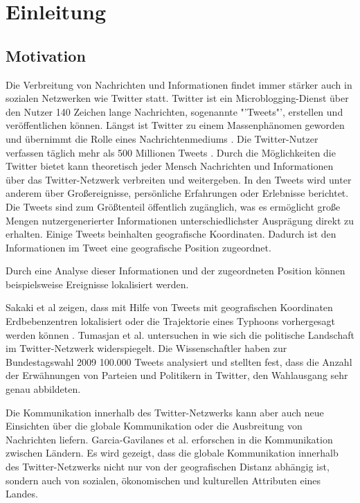\chapter{Einleitung}\label{chp:Einleitung}

	\section{Motivation}

		Die Verbreitung von Nachrichten und Informationen findet immer stärker auch in sozialen Netzwerken wie Twitter statt.
		Twitter ist ein Microblogging-Dienst über den Nutzer 140 Zeichen lange Nachrichten, sogenannte "'Tweets"', erstellen und veröffentlichen können.
		Längst ist Twitter zu einem Massenphänomen geworden und übernimmt die Rolle eines Nachrichtenmediums \cite{Petrovic2013}.
		Die Twitter-Nutzer verfassen täglich mehr als 500 Millionen Tweets \cite{twitterinc2013}. 
		Durch die Möglichkeiten die Twitter bietet kann theoretisch jeder Mensch Nachrichten und Informationen über das Twitter-Netzwerk verbreiten und weitergeben. 
		In den Tweets wird unter anderem über Großereignisse, persönliche Erfahrungen oder Erlebnisse berichtet. 
		Die Tweets sind zum Größtenteil öffentlich zugänglich, was es ermöglicht große Mengen nutzergenerierter Informationen unterschiedlichster Ausprägung direkt zu erhalten. 
		Einige Tweets beinhalten geografische Koordinaten. 
		Dadurch ist den Informationen im Tweet eine geografische Position zugeordnet.

		Durch eine Analyse dieser Informationen und der zugeordneten Position können beispielsweise Ereignisse lokalisiert werden.

		Sakaki et al zeigen, dass mit Hilfe von Tweets mit geografischen Koordinaten Erdbebenzentren lokalisiert oder die Trajektorie eines Typhoons vorhergesagt werden können \cite{Sakaki2010}.  
		Tumasjan et al. untersuchen in \cite{Tumasjan2011} wie sich die politische Landschaft im Twitter-Netzwerk widerspiegelt. 
		Die Wissenschaftler haben zur Bundestagswahl 2009 100.000 Tweets analysiert und stellten fest, dass die Anzahl der Erwähnungen von Parteien und Politikern in Twitter, den Wahlausgang sehr genau abbildeten.  
		
		Die Kommunikation innerhalb des Twitter-Netzwerks kann aber auch neue Einsichten über die globale Kommunikation oder die Ausbreitung von Nachrichten liefern.
		Garcia-Gavilanes et al. erforschen in \cite{Garcia-Gavilanes2014} die Kommunikation zwischen Ländern. 
		Es wird gezeigt, dass die globale Kommunikation innerhalb des Twitter-Netzwerks nicht nur von der geografischen Distanz abhängig ist, sondern auch von sozialen, ökonomischen und kulturellen Attributen eines Landes.   

